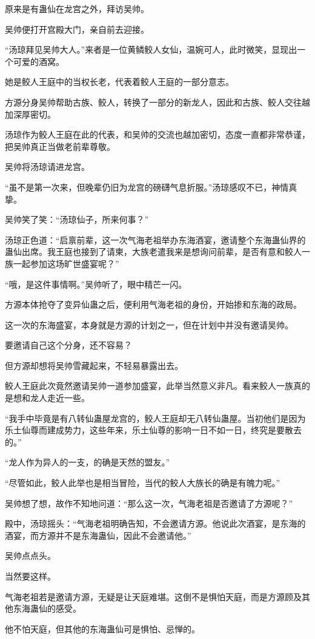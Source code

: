 \begin{this_body}
原来是有蛊仙在龙宫之外，拜访吴帅。

吴帅便打开宫殿大门，亲自前去迎接。

“汤琼拜见吴帅大人。”来者是一位黄鳞鲛人女仙，温婉可人，此时微笑，显现出一个可爱的酒窝。

她是鲛人王庭中的当权长老，代表着鲛人王庭的一部分意志。

方源分身吴帅帮助古族、鲛人，转换了一部分的新龙人，因此和古族、鲛人交往越加深厚密切。

汤琼作为鲛人王庭在此的代表，和吴帅的交流也越加密切，态度一直都非常恭谨，把吴帅真正当做老前辈尊敬。

吴帅将汤琼请进龙宫。

“虽不是第一次来，但晚辈仍旧为龙宫的磅礴气息折服。”汤琼感叹不已，神情真挚。

吴帅笑了笑：“汤琼仙子，所来何事？”

汤琼正色道：“启禀前辈，这一次气海老祖举办东海酒宴，邀请整个东海蛊仙界的蛊仙出席。我王庭也接到了请柬，大族老遣我来是想询问前辈，是否有意和鲛人一族一起参加这场旷世盛宴呢？”

“哦，是这件事情啊。”吴帅听了，眼中精芒一闪。

方源本体抢夺了变异仙蛊之后，便利用气海老祖的身份，开始掺和东海的政局。

这一次的东海盛宴，本身就是方源的计划之一，但在计划中并没有邀请吴帅。

要邀请自己这个分身，还不容易？

但方源却想将吴帅雪藏起来，不轻易暴露出去。

鲛人王庭此次竟然邀请吴帅一道参加盛宴，此举当然意义非凡。看来鲛人一族真的是想和龙人走近一些。

“我手中毕竟是有八转仙蛊屋龙宫的，鲛人王庭却无八转仙蛊屋。当初他们是因为乐土仙尊而建成势力，这些年来，乐土仙尊的影响一日不如一日，终究是要散去的。”

“龙人作为异人的一支，的确是天然的盟友。”

“尽管如此，鲛人此举也是相当冒险，当代的鲛人大族长的确是有魄力呢。”

吴帅想了想，故作不知地问道：“那么这一次，气海老祖是否邀请了方源呢？”

殿中，汤琼摇头：“气海老祖明确告知，不会邀请方源。他说此次酒宴，是东海的酒宴，而方源并不是东海蛊仙，因此不会邀请他。”

吴帅点点头。

当然要这样。

气海老祖若是邀请方源，无疑是让天庭难堪。这倒不是惧怕天庭，而是方源顾及其他东海蛊仙的感受。

他不怕天庭，但其他的东海蛊仙可是惧怕、忌惮的。


\end{this_body}
